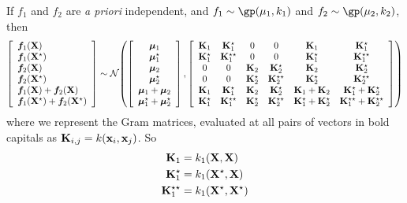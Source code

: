 If $f_1$ and $f_2$ are \emph{a priori} independent, and $f_1 \sim \gp( \mu_1, k_1)$ and $f_2 \sim \gp( \mu_2, k_2)$, then
%
\begin{align}
\left[ \begin{array}{l} 
\boldsymbol{f}_1(\mathbf{X}) \\
\boldsymbol{f}_1(\mathbf{X}^\star) \\
\boldsymbol{f}_2(\mathbf{X}) \\
\boldsymbol{f}_2(\mathbf{X}^\star) \\
\boldsymbol{f}_1(\mathbf{X}) + \boldsymbol{f}_2(\mathbf{X}) \\
\boldsymbol{f}_1(\mathbf{X}^\star) + \boldsymbol{f}_2(\mathbf{X}^\star)
\end{array} \right]
\sim
\mathcal{N}\!\left(
\left[ \begin{array}{c} {\boldsymbol{\mu}}_1 \\ {\boldsymbol{\mu}}_1^\star \\ {\boldsymbol{\mu}}_2 \\ {\boldsymbol{\mu}}_2^\star \\ {\boldsymbol{\mu}}_1 + {\boldsymbol{\mu}}_2 \\ {\boldsymbol{\mu}}_1^\star + {\boldsymbol{\mu}}_2^\star \end{array} \right]
,\left[ \begin{array}{cccccc} 
\mathbf{K}_1 & \mathbf{K}_1^\star & 0 & 0 & \mathbf{K}_1 & \mathbf{K}_1^\star \\ 
\mathbf{K}_1^\star & \mathbf{K}_1^{\star\star} & 0 & 0 & \mathbf{K}_1^\star & \mathbf{K}_1^{\star\star} \\
0 & 0 & \mathbf{K}_2 & \mathbf{K}_2^\star & \mathbf{K}_2 & \mathbf{K}_2^\star \\ 
0 & 0 & \mathbf{K}_2^\star & \mathbf{K}_2^{\star\star} & \mathbf{K}_2^\star & \mathbf{K}_2^{\star\star} \\
\mathbf{K}_1 & \mathbf{K}_1^\star & \mathbf{K}_2 & \mathbf{K}_2^\star & \mathbf{K}_1 + \mathbf{K}_2 & \mathbf{K}_1^\star + \mathbf{K}_2^\star \\ 
\mathbf{K}_1^\star & \mathbf{K}_1^{\star\star}  & \mathbf{K}_2^\star & \mathbf{K}_2^{\star\star}  & \mathbf{K}_1^\star + \mathbf{K}_2^\star & \mathbf{K}_1^{\star\star} + \mathbf{K}_2^{\star\star}\\
\end{array} \right]
\right)
\end{align}
%
where we represent the Gram matrices, evaluated at all pairs of vectors in bold capitals as ${\mathbf{K}_{i,j} = k({\bf{x}}_i, {\bf{x}}_j)}$.  So 
%
\begin{align}
\mathbf{K}_1 & = k_1( \mathbf{X}, \mathbf{X} ) \\
\mathbf{K}_1^\star & = k_1( \mathbf{X}^\star, \mathbf{X} ) \\
\mathbf{K}_1^{\star\star} & = k_1( \mathbf{X}^\star, \mathbf{X}^\star )
\end{align}

